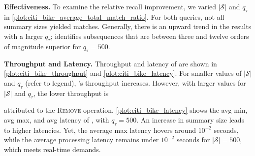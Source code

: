 \textbf{Effectiveness.} To examine the relative recall improvement, we varied
$|\mathcal{S}|$ and $q_\tau$ in
\autoref{plot:citi_bike_average_total_match_ratio}. For both queries, not all
summary sizes yielded matches. Generally,
there is an upward trend in the results with a larger
$q_\tau$; \suse{} identifies subsequences that are between three
and twelve orders of magnitude superior for $q_\tau = 500$.

\textbf{Throughput and Latency.} Throughput and
latency of \suse{} are shown in \autoref{plot:citi_bike_throughput} and
\autoref{plot:citi_bike_latency}. 
For smaller values of $|\mathcal{S}|$ and $q_\tau$ (refer to legend), \suse{}'s
throughput increases. 
However, with larger values for $|\mathcal{S}|$ and $q_\tau$, the lower
throughput is

attributed to the \textsc{Remove} operation.
\autoref{plot:citi_bike_latency} shows the avg min, avg max, and avg
latency of \suse{}, with $q_\tau = 500$. An increase in summary size leads to
higher latencies. Yet, the average max latency hovers around $10^{-2}$
seconds, while the average processing latency remains under $10^{-2}$ seconds
for $|\mathcal{S}| = 500$, which meets real-time demands.


